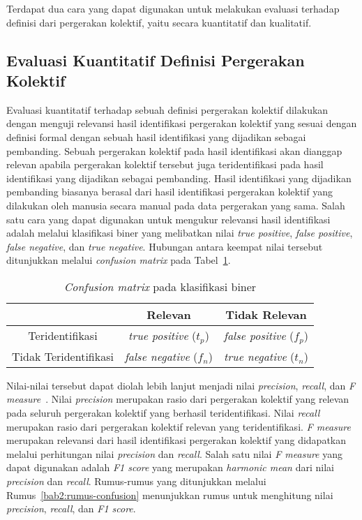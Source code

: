 Terdapat dua cara yang dapat digunakan untuk melakukan evaluasi terhadap definisi dari pergerakan kolektif, yaitu secara kuantitatif dan kualitatif.

\subsection{Evaluasi Kuantitatif Definisi Pergerakan Kolektif}
\label{subsec:quantitative-theory}

Evaluasi kuantitatif terhadap sebuah definisi pergerakan kolektif dilakukan dengan menguji relevansi hasil identifikasi pergerakan kolektif yang sesuai dengan definisi formal dengan sebuah hasil identifikasi yang dijadikan sebagai pembanding. Sebuah pergerakan kolektif pada hasil identifikasi akan dianggap relevan apabila pergerakan kolektif tersebut juga teridentifikasi pada hasil identifikasi yang dijadikan sebagai pembanding. Hasil identifikasi yang dijadikan pembanding biasanya berasal dari hasil identifikasi pergerakan kolektif yang dilakukan oleh manusia  secara manual pada data pergerakan yang sama. Salah satu cara yang dapat digunakan untuk mengukur relevansi hasil identifikasi adalah melalui klasifikasi biner yang melibatkan nilai \textit{true positive}, \textit{false positive}, \textit{false negative}, dan \textit{true negative}. Hubungan antara keempat nilai tersebut ditunjukkan melalui \textit{confusion matrix} pada Tabel~\ref{bab2:confusion}.

\begin{table}[htbp]
    \centering
    \caption{\textit{Confusion matrix} pada klasifikasi biner}
    \begin{tabular}{|c|c|c|}
        \hline
         & Relevan & Tidak Relevan  \\ \hline
        Teridentifikasi & \textit{true positive} ($t_p$) & \textit{false positive} ($f_p$) \\ \hline
        Tidak Teridentifikasi & \textit{false negative} ($f_n$) & \textit{true negative} ($t_n$) \\
        \hline
    \end{tabular}
    \label{bab2:confusion}
\end{table}

Nilai-nilai tersebut dapat diolah lebih lanjut menjadi nilai \textit{precision}, \textit{recall}, dan \textit{F measure}~\cite{manning:02:ir}. Nilai \textit{precision} merupakan rasio dari pergerakan kolektif yang relevan pada seluruh pergerakan kolektif yang berhasil teridentifikasi. Nilai \textit{recall} merupakan rasio dari pergerakan kolektif relevan yang teridentifikasi. \textit{F measure} merupakan relevansi dari hasil identifikasi pergerakan kolektif yang didapatkan melalui perhitungan nilai \textit{precision} dan \textit{recall}. Salah satu nilai \textit{F measure} yang dapat digunakan adalah \textit{F1 score} yang merupakan \textit{harmonic mean} dari nilai \textit{precision} dan \textit{recall}. Rumus-rumus yang ditunjukkan melalui Rumus~\ref{bab2:rumus-confusion} menunjukkan rumus untuk menghitung nilai \textit{precision}, \textit{recall}, dan \textit{F1 score}.

